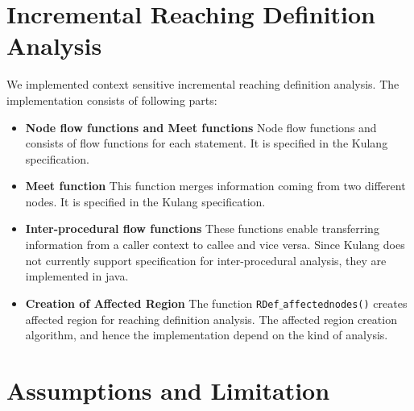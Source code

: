 \documentclass[11pt,a4paper,openright]{report}
\begin{document}
\section{Incremental Reaching Definition Analysis}
We implemented context sensitive incremental reaching definition analysis. The implementation
consists of following parts:
\begin{itemize}
 \item \textbf{Node flow functions and Meet functions} Node flow functions and consists of flow functions for 
 each statement.  It is specified in the Kulang specification. 
  \item \textbf{Meet function} This function merges information coming from two different nodes. It is specified in the Kulang specification.
 \item \textbf{Inter-procedural flow functions} These functions enable transferring information from a caller context to callee and vice versa.
 Since Kulang does not currently support specification for inter-procedural analysis, they are implemented in java.
 \item \textbf{Creation of Affected Region} The function \texttt{RDef$\_$affectednodes()} creates affected region for reaching definition
 analysis. The affected region creation algorithm, and hence the implementation depend on the kind of analysis.
\end{itemize}



\section{Assumptions and Limitation }
\end{document}
